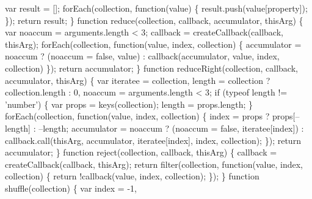 \begin{DoxyCodeInclude}
{{\textcolor{stringliteral}{    var result = [];}
\textcolor{stringliteral}{    forEach(collection, function(value) \{}
\textcolor{stringliteral}{      result.push(value[property]);}
\textcolor{stringliteral}{    \});}
\textcolor{stringliteral}{    return result;}
\textcolor{stringliteral}{  \}}
\textcolor{stringliteral}{}
\textcolor{stringliteral}{  function reduce(collection, callback, accumulator, thisArg) \{}
\textcolor{stringliteral}{    var noaccum = arguments.length < 3;}
\textcolor{stringliteral}{    callback = createCallback(callback, thisArg);}
\textcolor{stringliteral}{    forEach(collection, function(value, index, collection) \{}
\textcolor{stringliteral}{      accumulator = noaccum}
\textcolor{stringliteral}{        ? (noaccum = false, value)}
\textcolor{stringliteral}{        : callback(accumulator, value, index, collection)}
\textcolor{stringliteral}{    \});}
\textcolor{stringliteral}{    return accumulator;}
\textcolor{stringliteral}{  \}}
\textcolor{stringliteral}{}
\textcolor{stringliteral}{  function reduceRight(collection, callback, accumulator, thisArg) \{}
\textcolor{stringliteral}{    var iteratee = collection,}
\textcolor{stringliteral}{        length = collection ? collection.length : 0,}
\textcolor{stringliteral}{        noaccum = arguments.length < 3;}
\textcolor{stringliteral}{}
\textcolor{stringliteral}{    if (typeof length != 'number') \{}
\textcolor{stringliteral}{      var props = keys(collection);}
\textcolor{stringliteral}{      length = props.length;}
\textcolor{stringliteral}{    \}}
\textcolor{stringliteral}{    forEach(collection, function(value, index, collection) \{}
\textcolor{stringliteral}{      index = props ? props[--length] : --length;}
\textcolor{stringliteral}{      accumulator = noaccum}
\textcolor{stringliteral}{        ? (noaccum = false, iteratee[index])}
\textcolor{stringliteral}{        : callback.call(thisArg, accumulator, iteratee[index], index, collection);}
\textcolor{stringliteral}{    \});}
\textcolor{stringliteral}{    return accumulator;}
\textcolor{stringliteral}{  \}}
\textcolor{stringliteral}{}
\textcolor{stringliteral}{  function reject(collection, callback, thisArg) \{}
\textcolor{stringliteral}{    callback = createCallback(callback, thisArg);}
\textcolor{stringliteral}{    return filter(collection, function(value, index, collection) \{}
\textcolor{stringliteral}{      return !callback(value, index, collection);}
\textcolor{stringliteral}{    \});}
\textcolor{stringliteral}{  \}}
\textcolor{stringliteral}{}
\textcolor{stringliteral}{  function shuffle(collection) \{}
\textcolor{stringliteral}{    var index = -1,}
}}
\end{DoxyCodeInclude}
